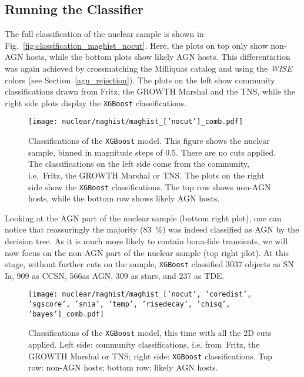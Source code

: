 \subsection{Running the Classifier}\label{classifier_res}
The full classification of the nuclear sample is shown in Fig.~\ref{fig:classification_maghist_nocut}. Here, the plots on top only show non-AGN hosts, while the bottom plots show likely AGN hosts. This differentiation was again achieved by crossmatching the Milliquas catalog and using the \textit{WISE} colors (see Section~\ref{agn_rejection}). The plots on the left show community classifications drawn from Fritz, the GROWTH Marshal and the TNS, while the right side plots display the \texttt{XGBoost} classifications.

\begin{figure}[H]
  \texttt{[image: nuclear/maghist/maghist\_['nocut']\_comb.pdf]}
  \caption[Classification without cuts]{Classifications of the \texttt{XGBoost} model. This figure shows the nuclear sample, binned in magnitude steps of $0.5$. There are no cuts applied. The classifications on the left side come from the community, i.e.~Fritz, the GROWTH Marshal or TNS. The plots on the right side show the \texttt{XGBoost} classifications. The top row shows non-AGN hosts, while the bottom row shows likely AGN hosts.}
\end{figure}

Looking at the AGN part of the nuclear sample (bottom right plot), one can notice that reassuringly the majority (\SI{83}{\percent}) was indeed classified as AGN by the decision tree. As it is much more likely to contain bona-fide transients, we will now focus on the non-AGN part of the nuclear sample (top right plot). At this stage, without further cuts on the sample, \texttt{XGBoost} classified 3037 objects as SN Ia, 909 as CCSN, 566as AGN, 309 as stars, and 237 as TDE.

\begin{figure}[htpb]
  \texttt{[image: nuclear/maghist/maghist\_['nocut', 'coredist', 'sgscore', 'snia', 'temp', 'risedecay', 'chisq', 'bayes']\_comb.pdf]}
  \caption[Classification with all 2D cuts]{Classifications of the \texttt{XGBoost} model, this time with all the 2D cuts applied. Left side: community classifications, i.e. from~Fritz, the GROWTH Marshal or TNS; right side: \texttt{XGBoost} classifications. Top row: non-AGN hosts; bottom row: likely AGN hosts.}
\end{figure}

